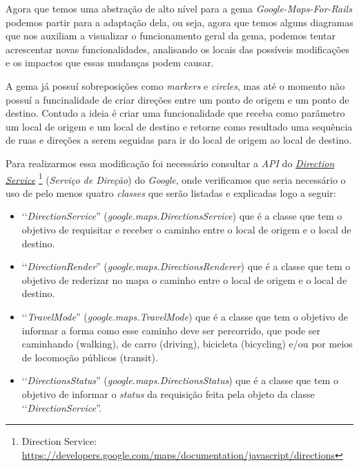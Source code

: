 Agora que temos uma abstração de alto nível para a gema \emph{Google-Maps-For-Rails} podemos partir para a 
adaptação dela, ou seja, agora que temos alguns diagramas que nos auxiliam a visualizar o funcionamento 
geral da gema, podemos tentar acrescentar novas funcionalidades, analisando os locais das possíveis 
modificações e os impactos que essas mudanças podem causar. 

A gema já possuí sobreposições como \emph{markers} e \emph{circles}, mas até o momento não possuí a 
funcinalidade de criar direções entre um ponto de origem e um ponto de destino. Contudo a ideia é criar 
uma funcionalidade que receba como parâmetro um local de origem e um local de destino e retorne como
resultado uma sequência de ruas e direções a serem seguidas para ir do local de origem ao local de destino.

Para realizarmos essa modificação foi necessário consultar a \emph{API} do 
\emph{\href{https://developers.google.com/maps/documentation/javascript/directions}{Direction Service}} 
\footnote{Direction Service: \url{https://developers.google.com/maps/documentation/javascript/directions}}
(\emph{Serviço de Direção}) do \emph{Google}, onde verificamos que seria necessário o uso de pelo menos
quatro \emph{classes} que serão listadas e explicadas logo a seguir:

\begin{itemize}

 \item ‘‘\emph{DirectionService}'' (\emph{google.maps.DirectionsService}) que é a classe que tem o 
 objetivo de requisitar e receber o caminho entre o local de origem e o local de destino.
 
 \item ‘‘\emph{DirectionRender}'' (\emph{google.maps.DirectionsRenderer}) que é a classe que tem o 
 objetivo de rederizar no mapa o caminho entre o local de origem e o local de destino.
 
 \item ‘‘\emph{TravelMode}'' (\emph{google.maps.TravelMode}) que é a classe que tem o objetivo de 
 informar a forma como esse caminho deve ser percorrido, que pode ser caminhando (walking), de carro 
 (driving), bicicleta (bicycling) e/ou por meios de locomoção públicos (transit).
 
 \item ‘‘\emph{DirectionsStatus}'' (\emph{google.maps.DirectionsStatus}) que é a classe que tem o
 objetivo de informar o \emph{status} da requisição feita pela objeto da classe
 ‘‘\emph{DirectionService}''.
 
\end{itemize}

